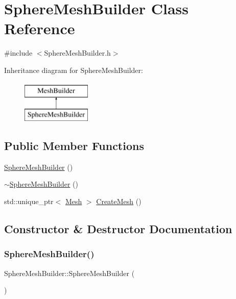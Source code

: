 \hypertarget{class_sphere_mesh_builder}{}\section{Sphere\+Mesh\+Builder Class Reference}
\label{class_sphere_mesh_builder}


{\ttfamily \#include $<$Sphere\+Mesh\+Builder.\+h$>$}

Inheritance diagram for Sphere\+Mesh\+Builder\+:\begin{figure}[H]
\begin{center}
\leavevmode
\includegraphics[height=2.000000cm]{class_sphere_mesh_builder}
\end{center}
\end{figure}
\subsection*{Public Member Functions}
\begin{DoxyCompactItemize}
\item 
\mbox{\hyperlink{class_sphere_mesh_builder_a37a49c120530dba0cc1fc3a9ab915418}{Sphere\+Mesh\+Builder}} ()
\item 
\mbox{\hyperlink{class_sphere_mesh_builder_a17bbfd3306548933c1d2d4a5ec226f75}{$\sim$\+Sphere\+Mesh\+Builder}} ()
\item 
std\+::unique\+\_\+ptr$<$ \mbox{\hyperlink{class_mesh}{Mesh}} $>$ \mbox{\hyperlink{class_sphere_mesh_builder_a17080b8851c3c5395e82536c44c0e7ec}{Create\+Mesh}} ()
\end{DoxyCompactItemize}


\subsection{Constructor \& Destructor Documentation}
\mbox{\label{class_sphere_mesh_builder_a37a49c120530dba0cc1fc3a9ab915418}} 
\subsubsection{\texorpdfstring{SphereMeshBuilder()}{SphereMeshBuilder()}}
{\footnotesize\ttfamily Sphere\+Mesh\+Builder\+::\+Sphere\+Mesh\+Builder (\begin{DoxyParamCaption}{ }\end{DoxyParamCaption})}

